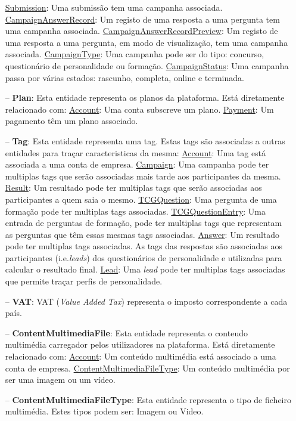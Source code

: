 \begin{itemize}
		\subitem \underline{Submission}: Uma submissão tem uma campanha associada.
		\subitem \underline{CampaignAnswerRecord}: Um registo de uma resposta a uma pergunta tem uma campanha associada.
		\subitem \underline{CampaignAnswerRecordPreview}: Um registo de uma resposta a uma pergunta, em modo de visualização, tem uma campanha associada.
		\subitem \underline{CampaignType}: Uma campanha pode ser do tipo: concurso, questionário de personalidade ou formação.
		\subitem \underline{CampaignStatus}: Uma campanha passa por várias estados: rascunho, completa, online e terminada.
	\item[--] \textbf{Plan}: Esta entidade representa os planos da plataforma. Está diretamente relacionado com:
		\subitem \underline{Account}: Uma conta subscreve um plano.
		\subitem \underline{Payment}: Um pagamento têm um plano associado.
	\item[--] \textbf{Tag}: Esta entidade representa uma tag. Estas tags são associadas a outras entidades para traçar caracteristicas da mesma:
		\subitem \underline{Account}: Uma tag está associada a uma conta de empresa.
		\subitem \underline{Campaign}: Uma campanha pode ter multiplas tags que serão associadas mais tarde aos participantes da mesma.
		\subitem \underline{Result}: Um resultado pode ter multiplas tags que serão associadas aos participantes a quem saia o mesmo.
		\subitem \underline{TCGQuestion}: Uma pergunta de uma formação pode ter multiplas tags associadas.
		\subitem \underline{TCGQuestionEntry}: Uma entrada de perguntas de formação, pode ter multiplas tags que representam as perguntas que têm essas mesmas tags associadas.
		\subitem \underline{Answer}: Um resultado pode ter multiplas tags associadas. As tags das respostas são associadas aos participantes (i.e.\textit{leads}) dos questionários de personalidade e utilizadas para calcular o resultado final.
		\subitem \underline{Lead}: Uma \textit{lead} pode ter multiplas tags associadas que permite traçar perfis de personalidade.
	\item[--] \textbf{VAT}: VAT (\textit{Value Added Tax}) representa o imposto correspondente a cada país.
	\item[--] \textbf{ContentMultimediaFile}: Esta entidade representa o conteudo multimédia carregador pelos utilizadores na plataforma. Está diretamente relacionado com:
		\subitem \underline{Account}: Um conteúdo multimédia está associado a uma conta de empresa.
		\subitem \underline{ContentMultimediaFileType}: Um conteúdo multimédia por ser uma imagem ou um vídeo.
	\item[--] \textbf{ContentMultimediaFileType}: Esta entidade representa o tipo de ficheiro multimédia. Estes tipos podem ser:  Imagem ou Video.

\end{itemize}
